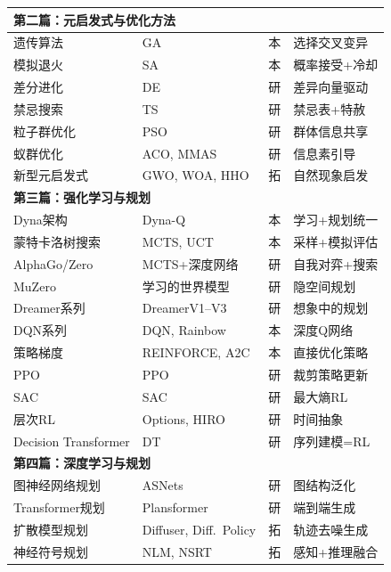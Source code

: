 \begin{longtable}{p{3.5cm}p{4cm}p{1.2cm}p{4.5cm}}
\multicolumn{4}{l}{\textbf{第二篇：元启发式与优化方法}} \\
\midrule
遗传算法 & GA & \textcolor{ugcolor}{本} & 选择交叉变异 \\
模拟退火 & SA & \textcolor{ugcolor}{本} & 概率接受+冷却 \\
差分进化 & DE & \textcolor{gradcolor}{研} & 差异向量驱动 \\
禁忌搜索 & TS & \textcolor{gradcolor}{研} & 禁忌表+特赦 \\
粒子群优化 & PSO & \textcolor{gradcolor}{研} & 群体信息共享 \\
蚁群优化 & ACO, MMAS & \textcolor{gradcolor}{研} & 信息素引导 \\
新型元启发式 & GWO, WOA, HHO & \textcolor{selfcolor}{拓} & 自然现象启发 \\
\midrule

\multicolumn{4}{l}{\textbf{第三篇：强化学习与规划}} \\
\midrule
Dyna架构 & Dyna-Q & \textcolor{ugcolor}{本} & 学习+规划统一 \\
蒙特卡洛树搜索 & MCTS, UCT & \textcolor{ugcolor}{本} & 采样+模拟评估 \\
AlphaGo/Zero & MCTS+深度网络 & \textcolor{gradcolor}{研} & 自我对弈+搜索 \\
MuZero & 学习的世界模型 & \textcolor{gradcolor}{研} & 隐空间规划 \\
Dreamer系列 & DreamerV1--V3 & \textcolor{gradcolor}{研} & 想象中的规划 \\
DQN系列 & DQN, Rainbow & \textcolor{ugcolor}{本} & 深度Q网络 \\
策略梯度 & REINFORCE, A2C & \textcolor{ugcolor}{本} & 直接优化策略 \\
PPO & PPO & \textcolor{gradcolor}{研} & 裁剪策略更新 \\
SAC & SAC & \textcolor{gradcolor}{研} & 最大熵RL \\
层次RL & Options, HIRO & \textcolor{gradcolor}{研} & 时间抽象 \\
Decision Transformer & DT & \textcolor{gradcolor}{研} & 序列建模=RL \\
\midrule

\multicolumn{4}{l}{\textbf{第四篇：深度学习与规划}} \\
\midrule
图神经网络规划 & ASNets & \textcolor{gradcolor}{研} & 图结构泛化 \\
Transformer规划 & Plansformer & \textcolor{gradcolor}{研} & 端到端生成 \\
扩散模型规划 & Diffuser, Diff.\ Policy & \textcolor{selfcolor}{拓} & 轨迹去噪生成 \\
神经符号规划 & NLM, NSRT & \textcolor{selfcolor}{拓} & 感知+推理融合 \\
\midrule


\end{longtable}
